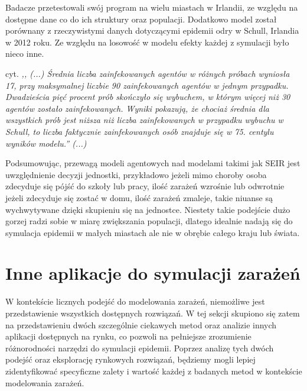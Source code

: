 Badacze przetestowali swój program na wielu miastach w Irlandii, ze względu na dostępne dane co do ich struktury oraz populacji.
Dodatkowo model został porównany z rzeczywistymi danych dotyczącymi epidemii odry w Schull, Irlandia w 2012 roku. Ze względu na losowość w modelu efekty każdej z symulacji było nieco inne. 

cyt. \textit{,, (...) Średnia liczba zainfekowanych agentów w różnych próbach wyniosła 17, przy maksymalnej liczbie 90 zainfekowanych agentów w jednym przypadku. Dwadzieścia pięć procent prób skończyło się wybuchem, w którym więcej niż 30 agentów zostało zainfekowanych. Wyniki pokazują, że chociaż średnia dla wszystkich prób jest niższa niż liczba zainfekowanych w przypadku wybuchu w Schull, to liczba faktycznie zainfekowanych osób znajduje się w 75. centylu wyników modelu.'' (...)} \cite{bib:artykul1}

Podsumowując, przewagą modeli agentowych nad modelami takimi jak SEIR jest uwzględnienie decyzji jednostki, przykładowo jeżeli mimo choroby osoba zdecyduje się pójść do szkoły lub pracy, ilość zarażeń wzrośnie lub odwrotnie jeżeli zdecyduje się zostać w domu, ilość zarażeń zmaleje, takie niuanse są wychwytywane dzięki skupieniu się na jednostce. Niestety takie podejście dużo gorzej radzi sobie w miarę zwiększania populacji, dlatego idealnie nadają się do symulacja epidemii w małych miastach ale nie w obrębie całego kraju lub świata.

\section{\textbf{Inne aplikacje do symulacji zarażeń}}

W kontekście licznych podejść do modelowania zarażeń, niemożliwe jest przedstawienie wszystkich dostępnych rozwiązań. W tej sekcji skupiono się zatem na przedstawieniu dwóch szczególnie ciekawych metod oraz analizie innych aplikacji dostępnych na rynku, co pozwoli na pełniejsze zrozumienie różnorodności narzędzi do symulacji epidemii. Poprzez analizę tych dwóch podejść oraz eksplorację rynkowych rozwiązań, będziemy mogli lepiej zidentyfikować specyficzne zalety i wartość każdej z badanych metod w kontekście modelowania zarażeń.


